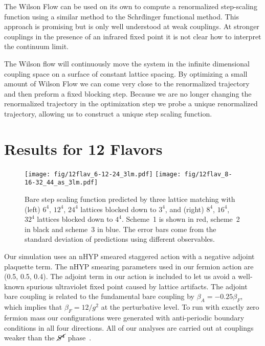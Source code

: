 \documentclass{PoS}
\newcommand{\Sb}{\ensuremath{\cancel{S^4}} }
\newcommand{\TODO}[1]{\textcolor{red}{{\bf #1}}}
\begin{document}
The Wilson Flow can be used on its own to compute a renormalized step-scaling function using a similar method to the Schr\"dinger functional method.
This approach is promising but is only well understood at weak couplings.
At stronger couplings in the presence of an infrared fixed point it is not clear how to interpret the continuum limit.

The Wilson flow will continuously move the system in the infinite dimensional coupling space on a surface of constant lattice spacing.
By optimizing a small amount of Wilson Flow we can come very close to the renormalized trajectory and then preform a fixed blocking step.
Because we are no longer changing the renormalized trajectory in the optimization step we probe a unique renormalized trajectory, allowing us to construct a unique step scaling function.



\section{Results for 12 Flavors}
\label{sec:results}
\begin{figure}[ht]
    \texttt{[image: fig/12flav\_6-12-24\_3lm.pdf]}\hfill
    \texttt{[image: fig/12flav\_8-16-32\_44\_as\_3lm.pdf]}
  \caption{Bare step scaling function predicted by three lattice matching with (left) $6^4$, $12^4$, $24^4$ lattices blocked down to $3^4$, and (right) $8^4$, $16^4$, $32^4$ lattices blocked down to $4^4$.  Scheme~1 is shown in red, scheme~2 in black and scheme~3 in blue.  The error bars come from the standard deviation of predictions using different observables.}
\label{fig:multischeme}
\end{figure}

Our simulation uses an nHYP smeared staggered action with a negative adjoint plaquette term.
The nHYP smearing parameters used in our fermion action are (0.5, 0.5, 0.4).
The adjoint term in our action is included to let us avoid a well-known spurious ultraviolet fixed point caused by lattice artifacts.
The adjoint bare coupling is related to the fundamental bare coupling by $\beta_A = -0.25\beta_F$, which implies that $\beta_F = 12 / g^2$ at the perturbative level.
To run with exactly zero fermion mass our configurations were generated with anti-periodic boundary conditions in all four directions.
All of our analyses are carried out at couplings weaker than the \Sb phase~\TODO{\cite{}}.
\end{document}
